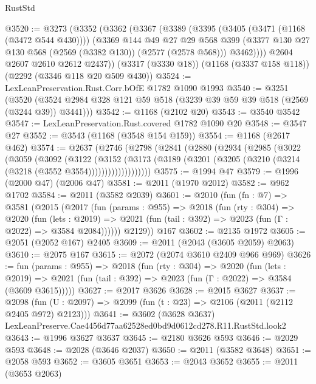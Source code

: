 \begin{lexlean}{RustStd}
\begin{coremodule}
@3520 := @3273
    (@3352
      (@3362
        (@3367
          (@3389
            (@3395
              (@3405 (@3471 (@1168 (@3472 @544 @430))))
              (@3369
                @144
                @49
                @27
                @29
                @568
                @399
                (@3377 @130 @27 @130 @568 (@2569 (@3382 @130)) (@2577 (@2578 @568)))
                @3462))))
        @2604
        @2607
        @2610
        @2612
        @2437))
    (@3317 (@3330 @18))
    (@1168 (@3337 @158 @118))
    (@2292 (@3346 @118 @20 @509 @430))
@3524 := LexLeanPreservation.Rust.Corr.bOfE @1782 @1090 @1993
@3540 := @3251
    (@3520 (@3524 @2984 @328 @121 @59 @518 (@3239 @39 @59 @39 @518 (@2569 (@3244 @39)) @3441)))
@3542 := @1168 (@2102 @20)
@3543 := @3540 @3542
@3547 := LexLeanPreservation.Rust.covered @1782 @1090 @20
@3548 := @3547 @27
@3552 := @3543 (@1168 (@3548 @154 @159))
@3554 := @1168 (@2617 @462)
@3574 := @2637
    (@2746
      (@2798
        (@2841
          (@2880
            (@2934
              (@2985
                (@3022
                  (@3059
                    (@3092
                      (@3122
                        (@3152
                          (@3173
                            (@3189
                              (@3201 (@3205 (@3210 (@3214 (@3218 (@3552 @3554)))))))))))))))))))
@3575 := @1994 @47
@3579 := @1996 (@2000 @47) (@2006 @47)
@3581 := @2011 (@1970 @2012)
@3582 := @962 @1702
@3584 := @2011 (@3582 @2039)
@3601 := @2010
    (fun (fn : @7) =>
    @3581
      (@2015
        (@2017
          (fun (params : @955) =>
          @2018
            (fun (rty : @304) =>
            @2020
              (fun (lets : @2019) =>
              @2021 (fun (tail : @392) => @2023 (fun (Γ : @2022) => @3584 @2084))))))
        @2129))
    @167
@3602 := @2135 @1972
@3605 := @2051 (@2052 @167) @2405
@3609 := @2011 (@2043 (@3605 @2059) @2063)
@3610 := @2075 @167
@3615 := @2072 (@2074 @3610 @2409 @966 @969)
@3626 := fun (params : @955) =>
  @2018
    (fun (rty : @304) =>
    @2020
      (fun (lets : @2019) =>
      @2021 (fun (tail : @392) => @2023 (fun (Γ : @2022) => @3584 (@3609 @3615)))))
@3627 := @2017 @3626
@3628 := @2015 @3627
@3637 := @2098 (fun (U : @2097) => @2099 (fun (t : @23) => @2106 (@2011 (@2112 @2405 @972) @2123)))
@3641 := @3602 (@3628 @3637) LexLeanPreserve.Cae4456d77aa62528ed0bd9d0612cd278.R11.RustStd.look2
@3643 := @1996 @3627 @3637
@3645 := @2180 @3626 @593
@3646 := @2029 @593
@3648 := @2028 (@3646 @2037)
@3650 := @2011 (@3582 @3648)
@3651 := @2058 @593
@3652 := @3605 @3651
@3653 := @2043 @3652
@3655 := @2011 (@3653 @2063)

\end{coremodule}
\end{lexlean}
